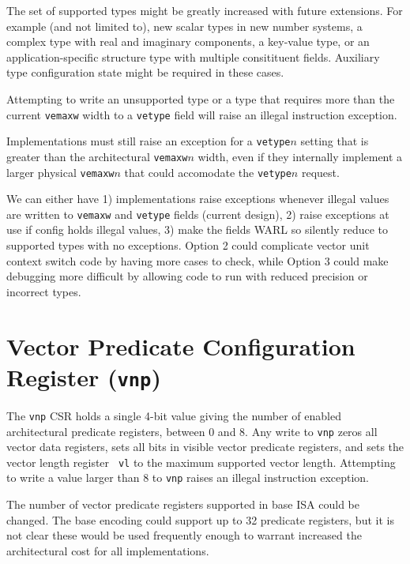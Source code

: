 \begin{commentary}
  The set of supported types might be greatly increased with future
  extensions.  For example (and not limited to), new scalar types in
  new number systems, a complex type with real and imaginary
  components, a key-value type, or an application-specific structure
  type with multiple consitituent fields.  Auxiliary type
  configuration state might be required in these cases.
\end{commentary}

Attempting to write an unsupported type or a type that requires more
than the current {\tt vemaxw} width to a {\tt vetype} field will raise
an illegal instruction exception.

\begin{commentary}
Implementations must still raise an exception for a {\tt vetype}$n$
setting that is greater than the architectural {\tt vemaxw}$n$ width,
even if they internally implement a larger physical {\tt vemaxw}$n$
that could accomodate the {\tt vetype}$n$ request.
\end{commentary}

\begin{discussion}
We can either have 1) implementations raise exceptions whenever
illegal values are written to {\tt vemaxw} and {\tt vetype} fields
(current design), 2) raise exceptions at use if config holds illegal
values, 3) make the fields WARL so silently reduce to supported types
with no exceptions.  Option 2 could complicate vector unit context
switch code by having more cases to check, while Option 3 could make
debugging more difficult by allowing code to run with reduced
precision or incorrect types.
\end{discussion}

\section{Vector Predicate Configuration Register ({\tt vnp})}

The {\tt vnp} CSR holds a single 4-bit value giving the number of
enabled architectural predicate registers, between 0 and 8.  Any write
to {\tt vnp} zeros all vector data registers, sets all bits in visible
vector predicate registers, and sets the vector length register {\tt
  vl} to the maximum supported vector length.  Attempting to write a
value larger than 8 to {\tt vnp} raises an illegal instruction
exception.

\begin{discussion}
The number of vector predicate registers supported in
  base ISA could be changed.  The base encoding could support up to 32
  predicate registers, but it is not clear these would be used
  frequently enough to warrant increased the architectural cost for
  all implementations.
\end{discussion}

